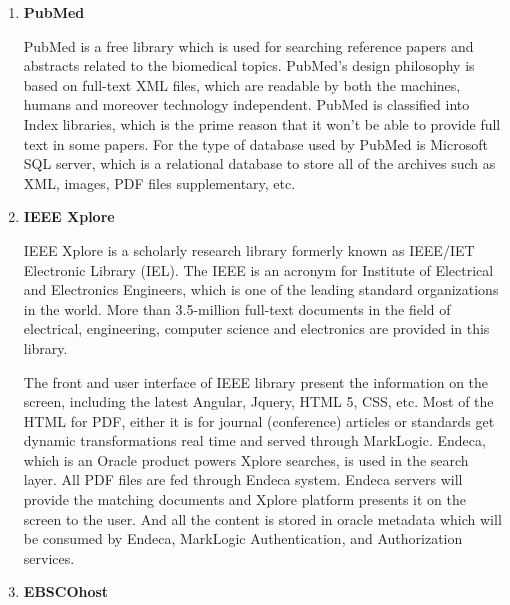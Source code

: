 \begin{enumerate}
	
	\item\textbf{PubMed}
	\setlength{\parindent}{1em}
		
	 PubMed is a free library which is used for searching reference papers and abstracts related to the biomedical topics.
	 PubMed’s design philosophy is based on full-text XML files, which are readable by both the machines, humans and moreover technology independent.
	 PubMed is classified into Index libraries, which is the prime reason that it won’t be able to provide full text in some papers.
	 For the type of database used by PubMed is Microsoft SQL server, which is a relational database to store all of the archives such as XML, images, PDF files supplementary, etc. 
		
	\item\textbf{IEEE Xplore}
	\setlength{\parindent}{1em}
	
	IEEE Xplore is a scholarly research library formerly known as IEEE/IET Electronic Library (IEL).
	The IEEE is an acronym for Institute of Electrical and Electronics Engineers, which is one of the leading standard organizations in the world.
	More than 3.5-million full-text documents in the field of electrical, engineering, computer science and electronics are provided in this library. 
	
	The front and user interface of IEEE library present the information on the screen, including the latest Angular, Jquery, HTML 5, CSS, etc. 
	Most of the HTML for PDF, either it is for journal (conference) articles or standards get dynamic transformations real time and served through MarkLogic.
	Endeca, which is an Oracle product powers Xplore searches, is used in the search layer.
	All PDF files are fed through Endeca system.
	Endeca servers will provide the matching documents and Xplore platform presents it on the screen to the user.
	And all the content is stored in oracle metadata which will be consumed by Endeca, MarkLogic Authentication, and Authorization services.
	
	\item\textbf{EBSCOhost}
	\setlength{\parindent}{1em}
	

\end{enumerate}
